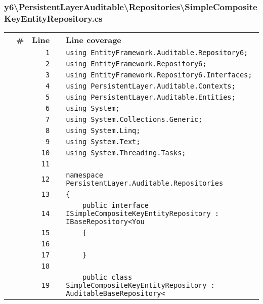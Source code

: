 \documentclass[a4paper,10pt]{article}
\begin{document}
\subsubsection{y6\textbackslash PersistentLayerAuditable\textbackslash Repositories\textbackslash SimpleCompositeKeyEntityRepository.cs}
\begin{longtable}[l]{lrrll}
\textbf{} & \textbf{\#} & \textbf{Line} & \textbf{} & \textbf{Line coverage}\\
\cellcolor{gray} &  & \verb~1~ & & \verb~using EntityFramework.Auditable.Repository6;~\\
\cellcolor{gray} &  & \verb~2~ & & \verb~using EntityFramework.Repository6;~\\
\cellcolor{gray} &  & \verb~3~ & & \verb~using EntityFramework.Repository6.Interfaces;~\\
\cellcolor{gray} &  & \verb~4~ & & \verb~using PersistentLayer.Auditable.Contexts;~\\
\cellcolor{gray} &  & \verb~5~ & & \verb~using PersistentLayer.Auditable.Entities;~\\
\cellcolor{gray} &  & \verb~6~ & & \verb~using System;~\\
\cellcolor{gray} &  & \verb~7~ & & \verb~using System.Collections.Generic;~\\
\cellcolor{gray} &  & \verb~8~ & & \verb~using System.Linq;~\\
\cellcolor{gray} &  & \verb~9~ & & \verb~using System.Text;~\\
\cellcolor{gray} &  & \verb~10~ & & \verb~using System.Threading.Tasks;~\\
\cellcolor{gray} &  & \verb~11~ & & \verb~~\\
\cellcolor{gray} &  & \verb~12~ & & \verb~namespace PersistentLayer.Auditable.Repositories~\\
\cellcolor{gray} &  & \verb~13~ & & \verb~{~\\
\cellcolor{gray} &  & \verb~14~ & & \verb~    public interface ISimpleCompositeKeyEntityRepository : IBaseRepository<You~\\
\cellcolor{gray} &  & \verb~15~ & & \verb~    {~\\
\cellcolor{gray} &  & \verb~16~ & & \verb~~\\
\cellcolor{gray} &  & \verb~17~ & & \verb~    }~\\
\cellcolor{gray} &  & \verb~18~ & & \verb~~\\
\cellcolor{gray} &  & \verb~19~ & & \verb~    public class SimpleCompositeKeyEntityRepository : AuditableBaseRepository<~\\

\end{longtable}
\end{document}
